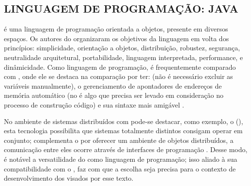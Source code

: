 \subsection{LINGUAGEM DE PROGRAMAÇÃO: JAVA}

 é uma linguagem de programação orientada a objetos, presente em diversos espaços. Os autores do  organizaram os objetivos da linguagem em volta dos princípios: simplicidade, orientação a objetos, distribuição, robustez, segurança, neutralidade arquitetural, portabilidade, linguagem interpretada, performance,  e dinâmicidade. Como linguagem de programação,  é frequentemente comparado com , onde ele se destaca na comparação por ter:  (não é necessário excluir as variáveis manualmente), o gerenciamento de apontadores de endereços de memória automático (no  é algo que precisa ser levado em consideração no processo de construção código) e sua sintaxe mais amigável \cite{corejavafundamentals}.

No ambiente de sistemas distribuídos com  pode-se destacar, como exemplo, o  (), esta tecnologia possibilita que sistemas totalmente distintos consigam operar em conjunto;  complementa o  por oferecer um ambiente de objetos distribuídos, a comunicação entre eles ocorre através de interfaces de programação \cite{oraclecorbajava}. Desse modo, é notável a versatilidade do  como linguagem de programação; isso aliado à sua compatibilidade com o , faz com que a escolha seja precisa para o contexto de desenvolvimento dos  visados por esse texto. 
